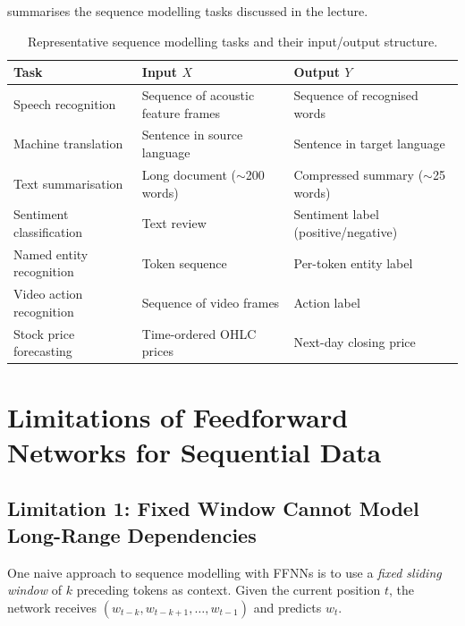 \documentclass[12pt,a4paper]{article}
\begin{document}
 summarises the sequence modelling tasks discussed in
the lecture.

\begin{table}[ht]
  \centering
  \caption{Representative sequence modelling tasks and their input/output
           structure.}
  \label{tab:applications}
  \begin{tabularx}{\linewidth}{lXX}
    \toprule
    \textbf{Task} & \textbf{Input $X$} & \textbf{Output $Y$} \\
    \midrule
    Speech recognition &
      Sequence of acoustic feature frames &
      Sequence of recognised words \\
    Machine translation &
      Sentence in source language &
      Sentence in target language \\
    Text summarisation &
      Long document ($\sim$200 words) &
      Compressed summary ($\sim$25 words) \\
    Sentiment classification &
      Text review &
      Sentiment label (positive/negative) \\
    Named entity recognition &
      Token sequence &
      Per-token entity label \\
    Video action recognition &
      Sequence of video frames &
      Action label \\
    Stock price forecasting &
      Time-ordered OHLC prices &
      Next-day closing price \\
    \bottomrule
  \end{tabularx}
\end{table}

\section{Limitations of Feedforward Networks for Sequential Data}
\label{sec:ffnn_limitations}

\subsection{Limitation 1: Fixed Window Cannot Model Long-Range Dependencies}
\label{subsec:fixed_window}

One naive approach to sequence modelling with FFNNs is to use a \emph{fixed
sliding window} of $k$ preceding tokens as context.  Given the current
position $t$, the network receives
$(w_{t-k}, w_{t-k+1}, \ldots, w_{t-1})$ and predicts $w_t$.
\end{document}
